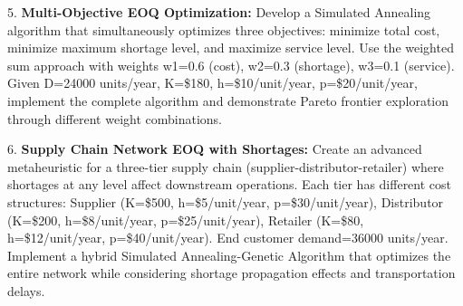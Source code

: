 \documentclass{article}
\begin{document}
5. \textbf{Multi-Objective EOQ Optimization:} Develop a Simulated Annealing algorithm that simultaneously optimizes three objectives: minimize total cost, minimize maximum shortage level, and maximize service level. Use the weighted sum approach with weights w1=0.6 (cost), w2=0.3 (shortage), w3=0.1 (service). Given D=24000 units/year, K=\$180, h=\$10/unit/year, p=\$20/unit/year, implement the complete algorithm and demonstrate Pareto frontier exploration through different weight combinations.

6. \textbf{Supply Chain Network EOQ with Shortages:} Create an advanced metaheuristic for a three-tier supply chain (supplier-distributor-retailer) where shortages at any level affect downstream operations. Each tier has different cost structures: Supplier (K=\$500, h=\$5/unit/year, p=\$30/unit/year), Distributor (K=\$200, h=\$8/unit/year, p=\$25/unit/year), Retailer (K=\$80, h=\$12/unit/year, p=\$40/unit/year). End customer demand=36000 units/year. Implement a hybrid Simulated Annealing-Genetic Algorithm that optimizes the entire network while considering shortage propagation effects and transportation delays.
\end{document}
